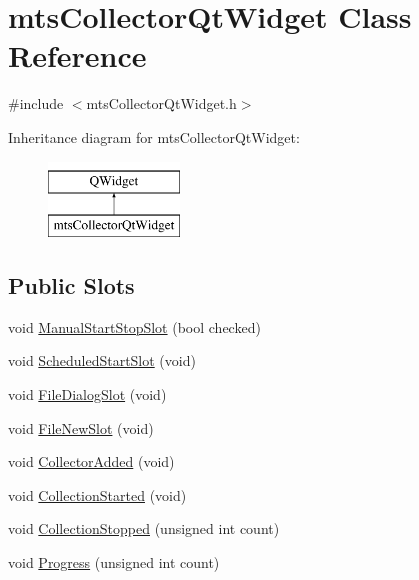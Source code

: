 \hypertarget{classmts_collector_qt_widget}{}\section{mts\+Collector\+Qt\+Widget Class Reference}
\label{classmts_collector_qt_widget}


{\ttfamily \#include $<$mts\+Collector\+Qt\+Widget.\+h$>$}

Inheritance diagram for mts\+Collector\+Qt\+Widget\+:\begin{figure}[H]
\begin{center}
\leavevmode
\includegraphics[height=2.000000cm]{d3/d0c/classmts_collector_qt_widget}
\end{center}
\end{figure}
\subsection*{Public Slots}
\begin{DoxyCompactItemize}
\item 
void \hyperlink{classmts_collector_qt_widget_ac84427666102b30301dc281035022370}{Manual\+Start\+Stop\+Slot} (bool checked)
\item 
void \hyperlink{classmts_collector_qt_widget_ae1f872571b518006dbac846732799bbf}{Scheduled\+Start\+Slot} (void)
\item 
void \hyperlink{classmts_collector_qt_widget_a9bfa3b15b9c73fe7a74a5c014f54283b}{File\+Dialog\+Slot} (void)
\item 
void \hyperlink{classmts_collector_qt_widget_add029ad069320cee33a3c71ca321c31c}{File\+New\+Slot} (void)
\item 
void \hyperlink{classmts_collector_qt_widget_ab80b163bdeff15ee02b654af0df624e1}{Collector\+Added} (void)
\item 
void \hyperlink{classmts_collector_qt_widget_a2e3642bfedf9a9b924dabccb053566bb}{Collection\+Started} (void)
\item 
void \hyperlink{classmts_collector_qt_widget_a061ce1d006282693529ed3301e91e1dc}{Collection\+Stopped} (unsigned int count)
\item 
void \hyperlink{classmts_collector_qt_widget_abee7d8df4566028839d766bcad663fed}{Progress} (unsigned int count)
\end{DoxyCompactItemize}
